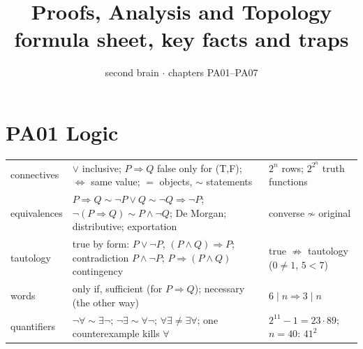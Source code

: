 \documentclass[9pt]{article}
\title{Proofs, Analysis and Topology\\\large formula sheet, key facts and traps}
\author{second brain $\cdot$ chapters PA01--PA07}
\date{}
\begin{document}
\maketitle
\vspace{-2.2em}

\section*{PA01 Logic}
\begin{tabular}{@{}p{2.9cm}p{8.4cm}p{6.1cm}@{}}
\toprule
connectives & $\vee$ inclusive; $P\Rightarrow Q$ false only for (T,F); $\Leftrightarrow$ same value; $=$ objects, $\sim$ statements & $2^n$ rows; $2^{2^n}$ truth functions\\
equivalences & $P\Rightarrow Q\sim\neg P\vee Q\sim\neg Q\Rightarrow\neg P$; $\neg(P\Rightarrow Q)\sim P\wedge\neg Q$; De Morgan; distributive; exportation & converse $\not\sim$ original\\
tautology & true by form: $P\vee\neg P$, $(P\wedge Q)\Rightarrow P$; contradiction $P\wedge\neg P$; $P\Rightarrow(P\wedge Q)$ contingency & true $\not\Rightarrow$ tautology ($0\ne1$, $5<7$)\\
words & only if, sufficient (for $P\Rightarrow Q$); necessary (the other way) & $6\mid n\Rightarrow3\mid n$\\
quantifiers & $\neg\forall\sim\exists\neg$; $\neg\exists\sim\forall\neg$; $\forall\exists\ne\exists\forall$; one counterexample kills $\forall$ & $2^{11}-1=23\cdot89$; $n=40$: $41^2$\\
\bottomrule
\end{tabular}
\end{document}

